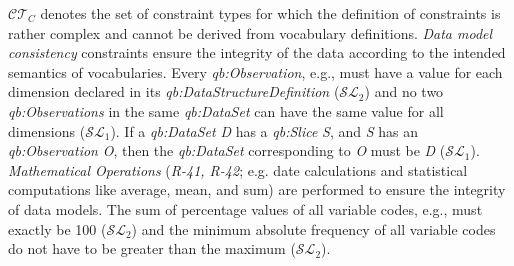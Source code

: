 \documentclass{llncs}
\begin{document}
{{$\mathcal{CT}_{C}$ denotes the set of constraint types for which the definition of constraints is rather complex and cannot be derived from vocabulary definitions.
\emph{Data model consistency} constraints ensure the integrity of
the data according to the intended semantics of vocabularies.
Every \emph{qb:Observation}, e.g., must have a value for each dimension
declared in its \emph{qb:DataStructureDefinition} ($\mathcal{SL}_{2}$)
and no two \emph{qb:Observations} in the same \emph{qb:DataSet}
can have the same value for all dimensions ($\mathcal{SL}_{1}$).
If a \emph{qb:DataSet} \emph{D} has a \emph{qb:Slice} \emph{S}, and \emph{S} has an
\emph{qb:Observation} \emph{O}, then the \emph{qb:DataSet} corresponding to \emph{O} must be \emph{D} ($\mathcal{SL}_{1}$).
{\em Mathematical Operations} (\emph{R-41, R-42}; e.g. date calculations and statistical computations like average, mean, and sum) are performed to ensure the integrity of data models.
The sum of percentage values of all variable codes, e.g., must exactly be 100 ($\mathcal{SL}_{2}$)
and the minimum absolute frequency of all variable codes do not have to be greater than the maximum ($\mathcal{SL}_{2}$).


}}
\end{document}
